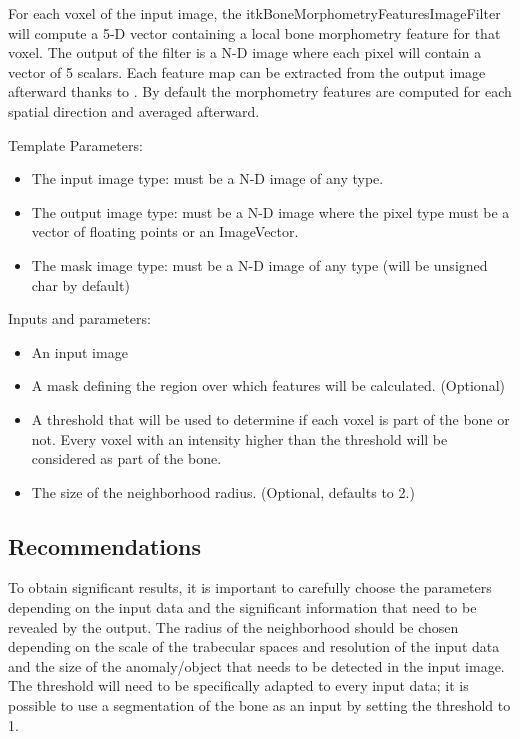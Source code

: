 \documentclass{InsightArticle}
\begin{document}
For each voxel of the input image, the itkBoneMorphometryFeaturesImageFilter will compute a 5-D vector containing a local bone morphometry feature for that voxel. The output of the filter is a N-D image where each pixel will contain a vector of 5 scalars. Each feature map can be extracted from the output image afterward thanks to . By default the morphometry features are computed for each spatial direction and averaged afterward.

Template Parameters:
\begin{itemize}
 \item The input image type: must be a N-D image of any type.
 \item The output image type: must be a N-D image where the pixel type must be a vector of floating points or an ImageVector.
 \item The mask image type: must be a N-D image of any type (will be unsigned char by default)
\end{itemize}

Inputs and parameters:
\begin{itemize}
 \item An input image
 \item A mask defining the region over which features will be calculated. (Optional)
 \item A threshold that will be used to determine if each voxel is part of the bone or not. Every voxel with an intensity higher than the threshold will be considered as part of the bone.
 \item The size of the neighborhood radius. (Optional, defaults to 2.)
\end{itemize}

\subsection{Recommendations}
\label{sec:recommendations}

To obtain significant results, it is important to carefully choose the parameters depending on the input data and the significant information that need to be revealed by the output. The radius of the neighborhood should be chosen depending on the scale of the trabecular spaces and resolution of the input data and the size of the anomaly/object that needs to be detected in the input image. The threshold will need to be specifically adapted to every input data; it is possible to use a segmentation of the bone as an input by setting the threshold to 1.
\end{document}
